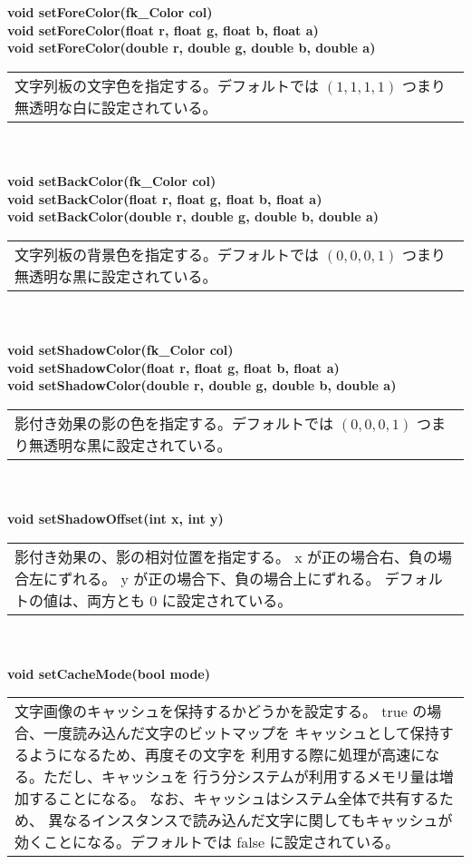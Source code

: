\begin{tabbing}
\> \textbf{void setForeColor(fk\_Color col)} \\
\> \textbf{void setForeColor(float r, float g, float b, float a)} \\
\> \textbf{void setForeColor(double r, double g, double b, double a)} \\
	\> \> \begin{tabular}{p{15cm}}
		文字列板の文字色を指定する。デフォルトでは
		\((1, 1, 1, 1)\) つまり無透明な白に設定されている。
	\end{tabular} \\ \\

\> \textbf{void setBackColor(fk\_Color col)} \\
\> \textbf{void setBackColor(float r, float g, float b, float a)} \\
\> \textbf{void setBackColor(double r, double g, double b, double a)} \\
	\> \> \begin{tabular}{p{15cm}}
		文字列板の背景色を指定する。デフォルトでは
		\((0, 0, 0, 1)\) つまり無透明な黒に設定されている。
	\end{tabular} \\ \\

\> \textbf{void setShadowColor(fk\_Color col)} \\
\> \textbf{void setShadowColor(float r, float g, float b, float a)} \\
\> \textbf{void setShadowColor(double r, double g, double b, double a)} \\
	\> \> \begin{tabular}{p{15cm}}
		影付き効果の影の色を指定する。デフォルトでは
		\((0, 0, 0, 1)\) つまり無透明な黒に設定されている。
	\end{tabular} \\ \\

\> \textbf{void setShadowOffset(int x, int y)} \\
	\> \> \begin{tabular}{p{15cm}}
		影付き効果の、影の相対位置を指定する。
		x が正の場合右、負の場合左にずれる。
		y が正の場合下、負の場合上にずれる。
		デフォルトの値は、両方とも 0 に設定されている。
	\end{tabular} \\ \\

\> \textbf{void setCacheMode(bool mode)} \\
	\> \> \begin{tabular}{p{15cm}}
		文字画像のキャッシュを保持するかどうかを設定する。
		true の場合、一度読み込んだ文字のビットマップを
		キャッシュとして保持するようになるため、再度その文字を
		利用する際に処理が高速になる。ただし、キャッシュを
		行う分システムが利用するメモリ量は増加することになる。
		なお、キャッシュはシステム全体で共有するため、
		異なるインスタンスで読み込んだ文字に関してもキャッシュが
		効くことになる。デフォルトでは false に設定されている。
	\end{tabular} \\ \\


\end{tabbing}
